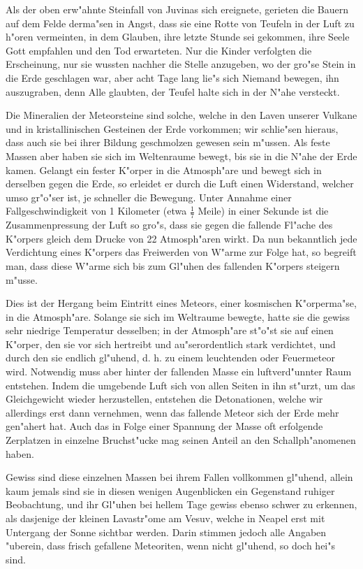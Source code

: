 \documentclass[a4paper, 11pt, oneside]{article}
\begin{document}
Als der oben erw"ahnte Steinfall von Juvinas sich ereignete, gerieten die Bauern auf dem Felde derma"sen in Angst, dass sie eine Rotte von Teufeln in der Luft zu h"oren vermeinten, in dem Glauben, ihre letzte Stunde sei gekommen, ihre Seele Gott empfahlen und den Tod erwarteten. Nur die Kinder verfolgten die Erscheinung, nur sie wussten nachher die Stelle anzugeben, wo der gro"se Stein in die Erde geschlagen war, aber acht Tage lang lie"s sich Niemand bewegen, ihn auszugraben, denn Alle glaubten, der Teufel halte sich in der N"ahe versteckt.

Die Mineralien der Meteorsteine sind solche, welche in den Laven unserer Vulkane und in kristallinischen Gesteinen der Erde vorkommen; wir schlie"sen hieraus, dass auch sie bei ihrer Bildung geschmolzen gewesen sein m"ussen. Als feste Massen aber haben sie sich im Weltenraume bewegt, bis sie in die N"ahe der Erde kamen. Gelangt ein fester K"orper in die Atmosph"are und bewegt sich in derselben gegen die Erde, so erleidet er durch die Luft einen Widerstand, welcher umso gr"o"ser ist, je schneller die Bewegung. Unter Annahme einer Fallgeschwindigkeit von 1 Kilometer (etwa $\frac{1}{7}$ Meile) in einer Sekunde ist die Zusammenpressung der Luft so gro"s, dass sie gegen die fallende Fl"ache des K"orpers gleich dem Drucke von 22 Atmosph"aren wirkt. Da nun bekanntlich jede Verdichtung eines K"orpers das Freiwerden von W"arme zur Folge hat, so begreift man, dass diese W"arme sich bis zum Gl"uhen des fallenden K"orpers steigern m"usse.

Dies ist der Hergang beim Eintritt eines Meteors, einer kosmischen K"orperma"se, in die Atmosph"are. Solange sie sich im Weltraume bewegte, hatte sie die gewiss sehr niedrige Temperatur desselben; in der Atmosph"are st"o"st sie auf einen K"orper, den sie vor sich hertreibt und au"serordentlich stark verdichtet, und durch den sie endlich gl"uhend, d. h. zu einem leuchtenden oder Feuermeteor wird. Notwendig muss aber hinter der fallenden Masse ein luftverd"unnter Raum entstehen. Indem die umgebende Luft sich von allen Seiten in ihn st"urzt, um das Gleichgewicht wieder herzustellen, entstehen die Detonationen, welche wir allerdings erst dann vernehmen, wenn das fallende Meteor sich der Erde mehr gen"ahert hat. Auch das in Folge einer Spannung der Masse oft erfolgende Zerplatzen in einzelne Bruchst"ucke mag seinen Anteil an den Schallph"anomenen haben.

Gewiss sind diese einzelnen Massen bei ihrem Fallen vollkommen gl"uhend, allein kaum jemals sind sie in diesen wenigen Augenblicken ein Gegenstand ruhiger Beobachtung, und ihr Gl"uhen bei hellem Tage gewiss ebenso schwer zu erkennen, als dasjenige der kleinen Lavastr"ome am Vesuv, welche in Neapel erst mit Untergang der Sonne sichtbar werden. Darin stimmen jedoch alle Angaben "uberein, dass frisch gefallene Meteoriten, wenn nicht gl"uhend, so doch hei"s sind.
\end{document}
